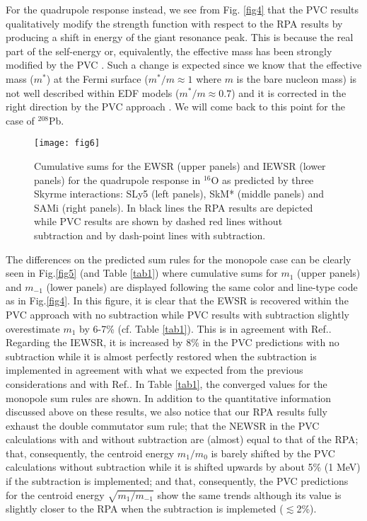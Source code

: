 \documentclass[12pt,a4paper,final]{iopart}
\begin{document}
For the quadrupole response instead, we see from Fig. \ref{fig4} that the PVC results qualitatively modify the strength function with respect to the RPA results by producing a shift in energy of the giant resonance peak. This is because the real part of the self-energy or, equivalently, the effective mass has been strongly modified by the PVC \cite{bertsch1968}. Such a change is expected since we know that the effective mass ($m^*$) at the Fermi surface ($m^*/m \approx 1$ where $m$ is the bare nucleon mass) is not well described within EDF models ($m^*/m \approx 0.7$) and it is corrected in the right direction by the PVC approach \cite{mahaux1985}. We will come back to this point for the case of ${}^{208}$Pb.

\begin{figure}[t!]                    
\texttt{[image: fig6]}
\caption{Cumulative sums for the EWSR (upper panels) and IEWSR (lower panels) for the quadrupole response in ${}^{16}$O as predicted by three Skyrme interactions: SLy5 \cite{sly5} (left panels), SkM* \cite{skm} (middle panels) and SAMi \cite{sami} (right panels). In black lines the RPA results are depicted while PVC results are shown by dashed red lines without subtraction and by dash-point lines with subtraction.} 
\label{fig6} 
\end{figure}

The differences on the predicted sum rules for the monopole case can be clearly seen in Fig.\ref{fig5} (and Table \ref{tab1}) where cumulative sums for $m_1$ (upper panels) and $m_{-1}$ (lower panels) are displayed following the same color and line-type code as in Fig.\ref{fig4}. In this figure, it is clear that the EWSR is recovered within the PVC approach with no subtraction while PVC results with subtraction slightly overestimate $m_1$ by 6-7\% (cf. Table \ref{tab1}). This is in agreement with Ref.\cite{yannouleas1987,wambach1990}. Regarding the IEWSR, it is increased by 8\% in the PVC predictions with no subtraction while it is almost perfectly restored when the subtraction is implemented in agreement with what we expected from the previous considerations and with Ref.\cite{tselyaev2013}. In Table \ref{tab1}, the converged values for the monopole sum rules are shown. In addition to the quantitative information discussed above on these results, we also notice that our RPA results fully exhaust the double commutator sum rule; that the NEWSR in the PVC calculations with and without subtraction are (almost) equal to that of the RPA; that, consequently, the centroid energy $m_1/m_0$ is barely shifted by the PVC calculations without subtraction while it is shifted upwards by about 5\% (1 MeV) if the subtraction is implemented; and that, consequently, the PVC predictions for the centroid energy $\sqrt{m_1/m_{-1}}$ show the same trends although its value is slightly closer to the RPA when the subtraction is implemeted ($\lesssim$2\%).
\end{document}
